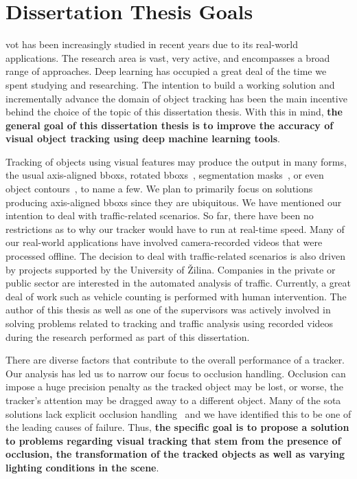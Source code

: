 \chapter{Dissertation Thesis Goals}
\label{chap:Goals}

\gls{vot} has been increasingly studied in recent years due to its real-world applications. The research area is vast, very active, and encompasses a broad range of approaches. Deep learning has occupied a great deal of the time we spent studying and researching. The intention to build a working solution and incrementally advance the domain of object tracking has been the main incentive behind the choice of the topic of this dissertation thesis. With this in mind, \textbf{the general goal of this dissertation thesis is to improve the accuracy of visual object tracking using deep machine learning tools}.

Tracking of objects using visual features may produce the output in many forms, the usual axis-aligned \glspl{bbox}, rotated \glspl{bbox}~\cite{chen2019rotbboxes}, segmentation masks~\cite{wang2019siammask}, or even object contours~\cite{yang2016encoderdecoder}, to name a few. We plan to primarily focus on solutions producing axis-aligned \glspl{bbox} since they are ubiquitous. We have mentioned our intention to deal with traffic-related scenarios. So far, there have been no restrictions as to why our tracker would have to run at real-time speed. Many of our real-world applications have involved camera-recorded videos that were processed offline. The decision to deal with traffic-related scenarios is also driven by projects supported by the University of Žilina. Companies in the private or public sector are interested in the automated analysis of traffic. Currently, a great deal of work such as vehicle counting is performed with human intervention. The author of this thesis as well as one of the supervisors was actively involved in solving problems related to tracking and traffic analysis using recorded videos during the research performed as part of this dissertation.

There are diverse factors that contribute to the overall performance of a tracker. Our analysis has led us to narrow our focus to occlusion handling. Occlusion can impose a huge precision penalty as the tracked object may be lost, or worse, the tracker's attention may be dragged away to a different object. Many of the \gls{sota} solutions lack explicit occlusion handling~\cite{guo2019siamcar, li2018siamrpn, wang2019siammask} and we have identified this to be one of the leading causes of failure. Thus, \textbf{the specific goal is to propose a solution to problems regarding visual tracking that stem from the presence of occlusion, the transformation of the tracked objects as well as varying lighting conditions in the scene}.

